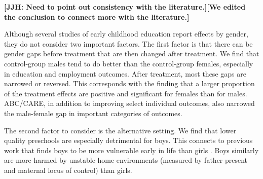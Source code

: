 \textbf{[JJH: Need to point out consistency with the literature.][We edited the conclusion to connect more with the literature.]}

Although several studies of early childhood education report effects by gender, they do not consider two important factors. The first factor is that there can be gender gaps before treatment that are then changed after treatment. We find that control-group males tend to do better than the control-group females, especially in education and employment outcomes. After treatment, most these gaps are narrowed or reversed. This corresponds with the finding that a larger proportion of the treatment effects are positive and significant for females than for males. ABC/CARE, in addition to improving select individual outcomes, also narrowed the male-female gap in important categories of outcomes. 

The second factor to consider is the alternative setting. We find that lower quality preschools are especially detrimental for boys. This connects to previous work that finds boys to be more vulnerable early in life than girls \citep{golding2016psychology}. Boys similarly are more harmed by unstable home environments (measured by father present and maternal locus of control) than girls. 

